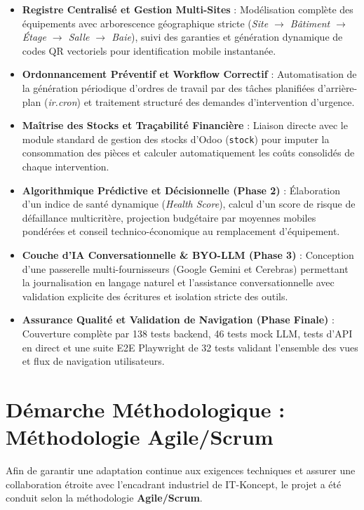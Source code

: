 \begin{itemize}[leftmargin=1.5cm, label=\textcolor{odooPurple}{\small\textbullet}]
    \item \textbf{Registre Centralisé et Gestion Multi-Sites} : Modélisation complète des équipements avec arborescence géographique stricte (\textit{Site $\rightarrow$ Bâtiment $\rightarrow$ Étage $\rightarrow$ Salle $\rightarrow$ Baie}), suivi des garanties et génération dynamique de codes QR vectoriels pour identification mobile instantanée.
    \item \textbf{Ordonnancement Préventif et Workflow Correctif} : Automatisation de la génération périodique d'ordres de travail par des tâches planifiées d'arrière-plan (\textit{ir.cron}) et traitement structuré des demandes d'intervention d'urgence.
    \item \textbf{Maîtrise des Stocks et Traçabilité Financière} : Liaison directe avec le module standard de gestion des stocks d'Odoo (\texttt{stock}) pour imputer la consommation des pièces et calculer automatiquement les coûts consolidés de chaque intervention.
    \item \textbf{Algorithmique Prédictive et Décisionnelle (Phase 2)} : Élaboration d'un indice de santé dynamique (\textit{Health Score}), calcul d'un score de risque de défaillance multicritère, projection budgétaire par moyennes mobiles pondérées et conseil technico-économique au remplacement d'équipement.
    \item \textbf{Couche d'IA Conversationnelle \& BYO-LLM (Phase 3)} : Conception d'une passerelle multi-fournisseurs (Google Gemini et Cerebras) permettant la journalisation en langage naturel et l'assistance conversationnelle avec validation explicite des écritures et isolation stricte des outils.
    \item \textbf{Assurance Qualité et Validation de Navigation (Phase Finale)} : Couverture complète par 138 tests backend, 46 tests mock LLM, tests d'API en direct et une suite E2E Playwright de 32 tests validant l'ensemble des vues et flux de navigation utilisateurs.
\end{itemize}

\section{Démarche Méthodologique : Méthodologie Agile/Scrum}
Afin de garantir une adaptation continue aux exigences techniques et assurer une collaboration étroite avec l'encadrant industriel de IT-Koncept, le projet a été conduit selon la méthodologie \textbf{Agile/Scrum}.

